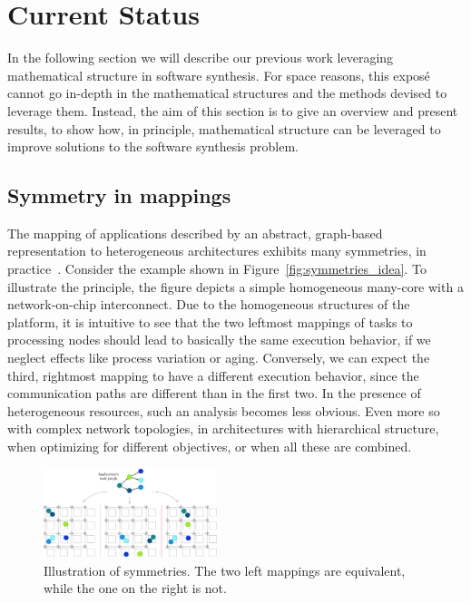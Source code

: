 \documentclass[sigplan,10pt]{acmart}
\begin{document}
\section{Current Status}

In the following section we will describe our previous work leveraging mathematical structure in software synthesis. For space reasons, this exposé cannot go in-depth in the mathematical structures and the methods devised to leverage them.
Instead, the aim of this section is to give an overview and present results, to show how, in principle, mathematical structure can be leveraged to improve solutions to the software synthesis problem.

\subsection{Symmetry in mappings}\label{sec:symmetries}

The mapping of applications described by an abstract, graph-based representation to heterogeneous architectures exhibits many symmetries, in practice~\cite{goens_iess15,goens_taco17}. Consider the example shown in Figure~\ref{fig:symmetries_idea}.
To illustrate the principle, the figure depicts a simple homogeneous many-core with a network-on-chip interconnect. Due to the homogeneous structures of the platform, it is intuitive to see that the two leftmost mappings of tasks to processing nodes should lead to basically the same execution behavior, 
if we neglect effects like process variation or aging.
Conversely, we can expect the third, rightmost mapping to have a different execution behavior, since the communication paths are different than in the first two. 
In the presence of heterogeneous resources, such an analysis becomes less obvious.
Even more so with complex network topologies, in architectures with hierarchical structure, when optimizing for different objectives, or when all these are combined.
\begin{figure}[h]
	\centering
	\includegraphics[width=0.45\textwidth]{figures/SymmetriesIntro.pdf}
	\caption{Illustration of symmetries. The two left mappings are equivalent, while the one on the right is not.}
	\label{fig:symmintro}
\end{figure}
\end{document}
